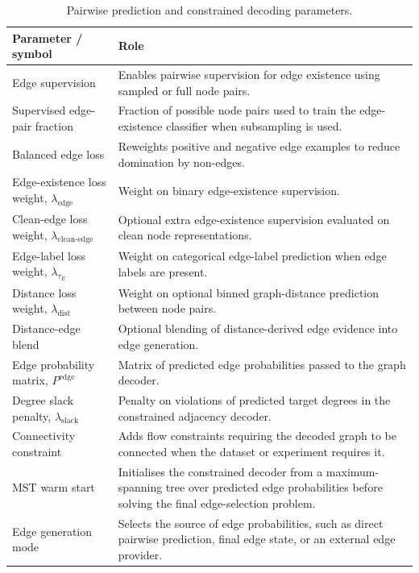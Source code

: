 \begin{table}[p]
\centering
\footnotesize
\begin{tabularx}{\textwidth}{@{}p{}X@{}}
\toprule
Parameter / symbol & Role \\
\midrule
Edge supervision & Enables pairwise supervision for edge existence using sampled or full node pairs. \\
Supervised edge-pair fraction & Fraction of possible node pairs used to train the edge-existence classifier when subsampling is used. \\
Balanced edge loss & Reweights positive and negative edge examples to reduce domination by non-edges. \\
Edge-existence loss weight, \(\lambda_{\mathrm{edge}}\) & Weight on binary edge-existence supervision. \\
Clean-edge loss weight, \(\lambda_{\mathrm{clean\text{-}edge}}\) & Optional extra edge-existence supervision evaluated on clean node representations. \\
Edge-label loss weight, \(\lambda_{\tau_E}\) & Weight on categorical edge-label prediction when edge labels are present. \\
Distance loss weight, \(\lambda_{\mathrm{dist}}\) & Weight on optional binned graph-distance prediction between node pairs. \\
Distance-edge blend & Optional blending of distance-derived edge evidence into edge generation. \\
Edge probability matrix, \(P^{\mathrm{edge}}\) & Matrix of predicted edge probabilities passed to the graph decoder. \\
Degree slack penalty, \(\lambda_{\mathrm{slack}}\) & Penalty on violations of predicted target degrees in the constrained adjacency decoder. \\
Connectivity constraint & Adds flow constraints requiring the decoded graph to be connected when the dataset or experiment requires it. \\
MST warm start & Initialises the constrained decoder from a maximum-spanning tree over predicted edge probabilities before solving the final edge-selection problem. \\
Edge generation mode & Selects the source of edge probabilities, such as direct pairwise prediction, final edge state, or an external edge provider. \\
\bottomrule
\end{tabularx}
\caption{Pairwise prediction and constrained decoding parameters.}
\label{tab:generator-decoding-parameters}
\end{table}

